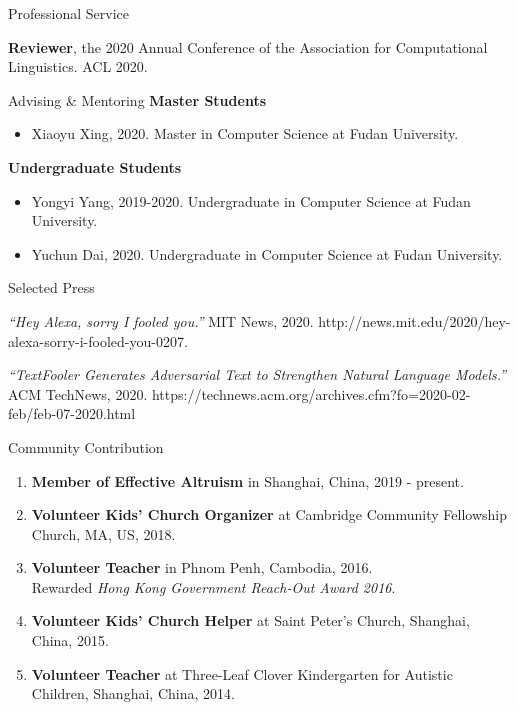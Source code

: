 \documentclass{resume} %
\begin{document}
\begin{rSection}{Professional Service}

\textbf{Reviewer}, the 2020 Annual Conference of the Association for Computational Linguistics. ACL 2020. 


\end{rSection}

\begin{rSection}{Advising \& Mentoring}
\textbf{Master Students}
\begin{itemize}
    \item Xiaoyu Xing, 2020. Master in Computer Science at Fudan University.
\end{itemize}


\textbf{Undergraduate Students}

\begin{itemize}
    \item Yongyi Yang, 2019-2020. Undergraduate in Computer Science at Fudan University.
    \item Yuchun Dai, 2020. Undergraduate in Computer Science at Fudan University.
\end{itemize}


\end{rSection}

\begin{rSection}{Selected Press}

\textit{``Hey Alexa, sorry I fooled you.''} MIT News, 2020. http://news.mit.edu/2020/hey-alexa-sorry-i-fooled-you-0207.

\textit{``TextFooler Generates Adversarial Text to Strengthen Natural Language Models.''} ACM TechNews, 2020. https://technews.acm.org/archives.cfm?fo=2020-02-feb/feb-07-2020.html

\end{rSection}


\begin{rSection}{Community Contribution} \itemsep -2pt
\begin{enumerate}
    \item \textbf{Member of Effective Altruism} in Shanghai, China, 2019 - present.
  \item \textbf{Volunteer Kids' Church Organizer} at Cambridge Community Fellowship Church, MA, US, 2018.
  
  \item \textbf{Volunteer Teacher} in Phnom Penh, Cambodia, 2016.
  \\ Rewarded \textit{Hong Kong Government Reach-Out Award 2016}.
  
  \item \textbf{Volunteer Kids' Church Helper} at Saint Peter's Church, Shanghai, China, 2015.
  \item \textbf{Volunteer Teacher} at Three-Leaf Clover Kindergarten for Autistic Children, Shanghai, China, 2014.
  
  
\end{enumerate}

\end{rSection}
\end{document}
